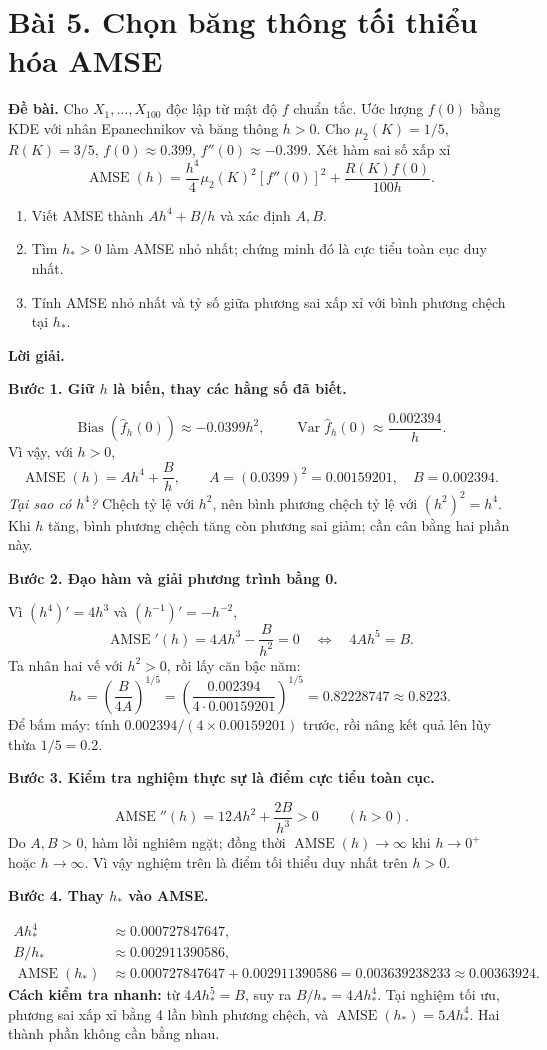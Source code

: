 \documentclass[11pt,a4paper]{article}
\newcommand{\fh}{\widehat f_h}
\DeclareMathOperator{\Var}{Var}
\DeclareMathOperator{\Bias}{Bias}
\DeclareMathOperator{\AMSE}{AMSE}
\newcommand{\buoc}[1]{\par\medskip\textbf{#1}\par}
\begin{document}
\clearpage
\section*{Bài 5. Chọn băng thông tối thiểu hóa AMSE}\label{core:optimal}
\textbf{Đề bài.} Cho $X_1,\ldots,X_{100}$ độc lập từ mật độ $f$ chuẩn tắc.
Ước lượng $f(0)$ bằng KDE với nhân Epanechnikov và băng thông $h>0$.
Cho $\mu_2(K)=1/5$, $R(K)=3/5$, $f(0)\approx0.399$, $f''(0)\approx-0.399$.
Xét hàm sai số xấp xỉ
\[
\AMSE(h)=\frac{h^4}{4}\mu_2(K)^2[f''(0)]^2+\frac{R(K)f(0)}{100h}.
\]
\begin{enumerate}[label=(\alph*)]
\item Viết AMSE thành $Ah^4+B/h$ và xác định $A,B$.
\item Tìm $h_*>0$ làm AMSE nhỏ nhất; chứng minh đó là cực tiểu toàn cục duy nhất.
\item Tính AMSE nhỏ nhất và tỷ số giữa phương sai xấp xỉ với bình phương chệch tại $h_*$.
\end{enumerate}
\textbf{Lời giải.}
\buoc{Bước 1. Giữ $h$ là biến, thay các hằng số đã biết.}
\[
\Bias(\fh(0))\approx-0.0399h^2,\qquad
\Var\fh(0)\approx\frac{0.002394}{h}.
\]
Vì vậy, với $h>0$,
\[
\boxed{\AMSE(h)=Ah^4+\frac Bh,\qquad
A=(0.0399)^2=0.00159201,\quad B=0.002394.}
\]
\textit{Tại sao có $h^4$?} Chệch tỷ lệ với $h^2$, nên bình phương chệch tỷ lệ với $(h^2)^2=h^4$. Khi $h$ tăng, bình phương chệch tăng còn phương sai giảm; cần cân bằng hai phần này.

\buoc{Bước 2. Đạo hàm và giải phương trình bằng 0.}
Vì $(h^4)'=4h^3$ và $(h^{-1})'=-h^{-2}$,
\[
\AMSE'(h)=4Ah^3-\frac{B}{h^2}=0
\quad\Longleftrightarrow\quad4Ah^5=B.
\]
Ta nhân hai vế với $h^2>0$, rồi lấy căn bậc năm:
\[
h_* =\left(\frac{B}{4A}\right)^{1/5}
=\left(\frac{0.002394}{4\cdot0.00159201}\right)^{1/5}
=\boxed{0.82228747\approx0.8223}.
\]
Để bấm máy: tính $0.002394/(4\times0.00159201)$ trước, rồi nâng kết quả lên lũy thừa $1/5=0.2$.

\buoc{Bước 3. Kiểm tra nghiệm thực sự là điểm cực tiểu toàn cục.}
\[
\AMSE''(h)=12Ah^2+\frac{2B}{h^3}>0\qquad(h>0).
\]
Do $A,B>0$, hàm lồi nghiêm ngặt; đồng thời $\AMSE(h)\to\infty$ khi $h\to0^+$ hoặc $h\to\infty$. Vì vậy nghiệm trên là điểm tối thiểu duy nhất trên $h>0$.

\buoc{Bước 4. Thay $h_*$ vào AMSE.}
\begin{align*}
A h_*^4&\approx0.000727847647,\\
B/h_*&\approx0.002911390586,\\
\AMSE(h_*)&\approx0.000727847647+0.002911390586
=\boxed{0.003639238233\approx0.00363924}.
\end{align*}
\textbf{Cách kiểm tra nhanh:} từ $4Ah_*^5=B$, suy ra $B/h_*=4Ah_*^4$. Tại nghiệm tối ưu, phương sai xấp xỉ bằng 4 lần bình phương chệch, và $\AMSE(h_*)=5Ah_*^4$. Hai thành phần không cần bằng nhau.
\end{document}
